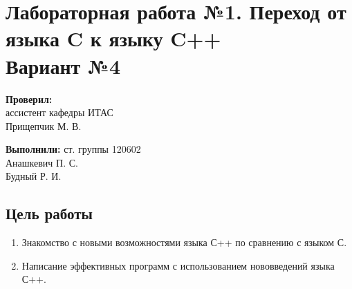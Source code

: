 \documentclass[a4paper,12pt]{article}
\begin{document}
\section*{Лабораторная работа №1.  Переход от языка C к языку C++ \\ Вариант №4}


\begin{multicols}{2}
  \begin{flushleft}
    \textbf{Проверил:} \\
    ассистент кафедры ИТАС \\
    Прищепчик М. В.

  \end{flushleft}

  \begin{flushright}
    \textbf{Выполнили:} ст. группы 120602 \\
    Анашкевич П. С. \\
    Будный Р. И. 
  \end{flushright}
\end{multicols}

\subsection{Цель работы}

\begin{enumerate}
\item Знакомство с новыми возможностями языка С++ по сравнению с языком С.
\item Написание эффективных программ с использованием нововведений языка С++.
\end{enumerate}
\end{document}
